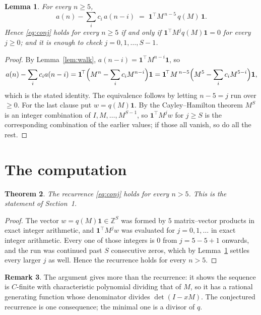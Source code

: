 \documentclass[11pt,a4paper]{article}
\theoremstyle{plain}
\newtheorem{theorem}{Theorem}
\newtheorem{lemma}[theorem]{Lemma}
\theoremstyle{definition}
\newtheorem{remark}[theorem]{Remark}
\begin{document}
\begin{lemma}\label{lem:crit}
For every $n\ge5$,
\[
a(n)-\sum_i c_i\,a(n-i)\;=\;\mathbf{1}^{\!\top}M^{\,n-5}\,q(M)\,\mathbf{1} .
\]
Hence \eqref{eq:conj} holds for every $n\ge5$ if and only if
$\mathbf{1}^{\!\top}M^{j}q(M)\mathbf{1}=0$ for every $j\ge0$; and it is enough to
check $j=0,1,\dots,S-1$.
\end{lemma}

\begin{proof}
By Lemma~\ref{lem:walk}, $a(n-i)=\mathbf{1}^{\!\top}M^{n-i}\mathbf{1}$, so
\[
a(n)-\sum_i c_i a(n-i)
=\mathbf{1}^{\!\top}\Bigl(M^{n}-\sum_i c_i M^{n-i}\Bigr)\mathbf{1}
=\mathbf{1}^{\!\top}M^{\,n-5}\Bigl(M^{5}-\sum_i c_i M^{5-i}\Bigr)\mathbf{1},
\]
which is the stated identity. The equivalence follows by letting $n-5=j$ run over
$\ge0$. For the last clause put $w=q(M)\mathbf{1}$. By the Cayley--Hamilton theorem
$M^{S}$ is an integer combination of $I,M,\dots,M^{S-1}$, so
$\mathbf{1}^{\!\top}M^{j}w$ for $j\ge S$ is the corresponding combination of the
earlier values; if those all vanish, so do all the rest.
\end{proof}

\section{The computation}

\begin{theorem}
The recurrence \eqref{eq:conj} holds for every $n>5$. This is the statement of
Section~1.
\end{theorem}

\begin{proof}
The vector $w=q(M)\mathbf{1}\in\mathbb{Z}^{S}$ was formed by $5$ matrix--vector
products in exact integer arithmetic, and $\mathbf{1}^{\!\top}M^{j}w$ was evaluated for
$j=0,1,\dots$ in exact integer arithmetic. Every one of those integers is $0$ from
$j=5-5+1$ onwards, and the run was continued past $S$ consecutive zeros, which by
Lemma~\ref{lem:crit} settles every larger $j$ as well. Hence the recurrence holds for
every $n>5$.
\end{proof}

\begin{remark}
The argument gives more than the recurrence: it shows the sequence is $C$-finite with
characteristic polynomial dividing that of $M$, so it has a rational generating function
whose denominator divides $\det(I-xM)$. The conjectured recurrence is one consequence; the
minimal one is a divisor of $q$.
\end{remark}
\end{document}
